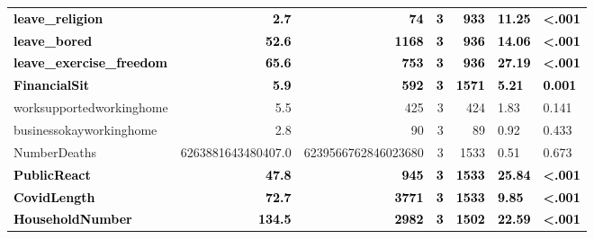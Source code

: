 \documentclass[]{article}
\begin{document}
\begin{table}[H]
\begin{tabular}[t]{lrrrrll}
\textcolor{black}{\textbf{leave\_religion}} & \textcolor{black}{\textbf{2.7}} & \textcolor{black}{\textbf{74}} & \textcolor{black}{\textbf{3}} & \textcolor{black}{\textbf{933}} & \textcolor{black}{\textbf{11.25}} & \textcolor{black}{\textbf{<.001}}\\
\textcolor{black}{\textbf{leave\_bored}} & \textcolor{black}{\textbf{52.6}} & \textcolor{black}{\textbf{1168}} & \textcolor{black}{\textbf{3}} & \textcolor{black}{\textbf{936}} & \textcolor{black}{\textbf{14.06}} & \textcolor{black}{\textbf{<.001}}\\
\addlinespace
\textcolor{black}{\textbf{leave\_exercise\_freedom}} & \textcolor{black}{\textbf{65.6}} & \textcolor{black}{\textbf{753}} & \textcolor{black}{\textbf{3}} & \textcolor{black}{\textbf{936}} & \textcolor{black}{\textbf{27.19}} & \textcolor{black}{\textbf{<.001}}\\
\textcolor{black}{\textbf{FinancialSit}} & \textcolor{black}{\textbf{5.9}} & \textcolor{black}{\textbf{592}} & \textcolor{black}{\textbf{3}} & \textcolor{black}{\textbf{1571}} & \textcolor{black}{\textbf{5.21}} & \textcolor{black}{\textbf{0.001}}\\
worksupportedworkinghome & 5.5 & 425 & 3 & 424 & 1.83 & 0.141\\
businessokayworkinghome & 2.8 & 90 & 3 & 89 & 0.92 & 0.433\\
NumberDeaths & 6263881643480407.0 & 6239566762846023680 & 3 & 1533 & 0.51 & 0.673\\
\addlinespace
\textcolor{black}{\textbf{PublicReact}} & \textcolor{black}{\textbf{47.8}} & \textcolor{black}{\textbf{945}} & \textcolor{black}{\textbf{3}} & \textcolor{black}{\textbf{1533}} & \textcolor{black}{\textbf{25.84}} & \textcolor{black}{\textbf{<.001}}\\
\textcolor{black}{\textbf{CovidLength}} & \textcolor{black}{\textbf{72.7}} & \textcolor{black}{\textbf{3771}} & \textcolor{black}{\textbf{3}} & \textcolor{black}{\textbf{1533}} & \textcolor{black}{\textbf{9.85}} & \textcolor{black}{\textbf{<.001}}\\
\textcolor{black}{\textbf{HouseholdNumber}} & \textcolor{black}{\textbf{134.5}} & \textcolor{black}{\textbf{2982}} & \textcolor{black}{\textbf{3}} & \textcolor{black}{\textbf{1502}} & \textcolor{black}{\textbf{22.59}} & \textcolor{black}{\textbf{<.001}}\\
\bottomrule
\end{tabular}
\end{table}

\newpage
\end{document}
